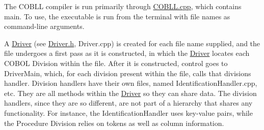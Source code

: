 The COBLL compiler is run primarily through {\ttfamily \mbox{\hyperlink{_c_o_b_l_l_8cpp}{COBLL.\+cpp}}}, which contains {\ttfamily main}. To use, the executable is run from the terminal with file names as command-\/line arguments.

A \mbox{\hyperlink{class_driver}{Driver}} (see {\ttfamily \mbox{\hyperlink{_driver_8h_source}{Driver.\+h}}}, {\ttfamily Driver.\+cpp}) is created for each file name supplied, and the file undergoes a first pass as it is constructed, in which the \mbox{\hyperlink{class_driver}{Driver}} locates each COBOL Division within the file. After it is constructed, control goes to {\ttfamily Driver\+Main}, which, for each division present within the file, calls that division\textquotesingle{}s handler. Division handlers have their own files, named {\ttfamily Identification\+Handler.\+cpp}, etc. They are all methods within the \mbox{\hyperlink{class_driver}{Driver}} so they can share data. The division handlers, since they are so different, are not part of a hierarchy that shares any functionality. For instance, the Identification\+Handler uses key-\/value pairs, while the Procedure Division relies on tokens as well as column information. 